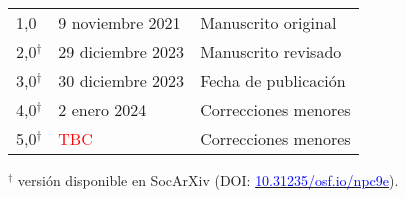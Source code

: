 \documentclass[a4paper]{tufte-handout}
\begin{document}
\vspace{-0.6cm}
\begin{table}[h!]
\begin{tabular}{@{}lll@{}}
{\small 1,0} & {\small 9 noviembre 2021} & {\small Manuscrito original} \\[0.8mm]
{\small 2,0$^\dagger$} & {\small 29 diciembre 2023} & {\small Manuscrito revisado} \\[0.8mm]
{\small 3,0$^\dagger$} & {\small 30 diciembre 2023} & {\small Fecha de publicación} \\[0.8mm]
{\small 4,0$^\dagger$} & {\small 2 enero 2024} & {\small Correcciones menores} \\[0.8mm]
{\small 5,0$^\dagger$} & {\small\textcolor{red}{ TBC}} & {\small Correcciones menores} \\
\end{tabular}
\end{table}
\vspace{0.3cm}
{\noindent \footnotesize {\normalsize $^\dagger$} versión disponible en SocArXiv ({\scriptsize DOI:} \href{https://doi.org/10.31235/osf.io/npc9e}{\textcolor{blue}{10.31235/osf.io/npc9e}}).}
\end{document}

